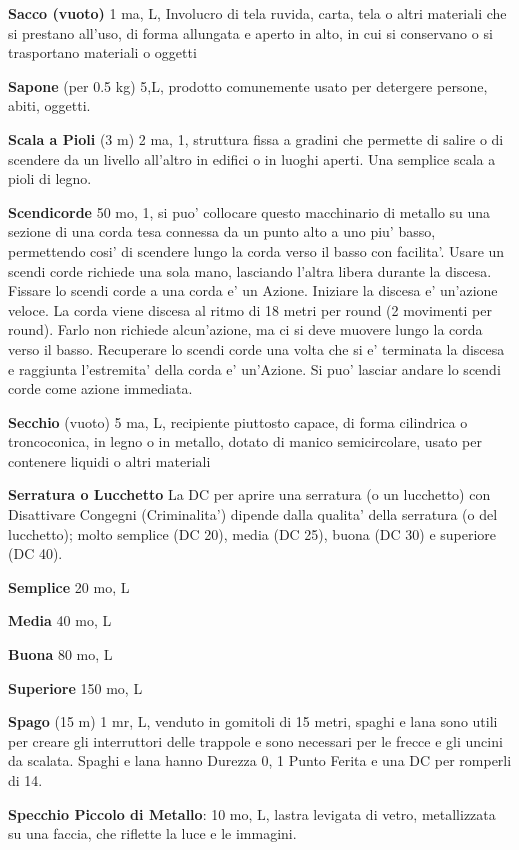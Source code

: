 \documentclass[a4paper,11pt,twoside,openany]{book}
\begin{document}
{\textbf{Sacco (vuoto)} 1 ma, L, Involucro di tela ruvida, carta, tela o altri materiali che si prestano all'uso, di forma allungata e aperto in alto, in cui si conservano o si trasportano materiali o oggetti

\textbf{Sapone} (per 0.5 kg) 5,L, prodotto comunemente usato per detergere persone, abiti, oggetti.

\textbf{Scala a Pioli} (3 m) 2 ma, 1, struttura fissa a gradini che permette di salire o di scendere da un livello all'altro in edifici o in luoghi aperti. Una semplice scala a pioli di legno.

\textbf{Scendicorde} 50 mo, 1, si puo' collocare questo macchinario di metallo su una sezione di una corda tesa connessa da un punto alto a uno piu' basso, permettendo cosi' di scendere lungo la corda verso il basso con facilita'. Usare un scendi corde richiede una sola mano, lasciando l'altra libera durante la discesa. Fissare lo scendi corde a una corda e' un Azione. Iniziare la discesa e' un'azione veloce. La corda viene discesa al ritmo di 18 metri per round (2 movimenti per round). Farlo non richiede alcun'azione, ma ci si deve muovere lungo la corda verso il basso. Recuperare lo scendi corde una volta che si e' terminata la discesa e raggiunta l'estremita' della corda e' un'Azione.
Si puo' lasciar andare lo scendi corde come azione immediata.

\textbf{Secchio} (vuoto) 5 ma, L, recipiente piuttosto capace, di forma cilindrica o troncoconica, in legno o in metallo, dotato di manico semicircolare, usato per contenere liquidi o altri materiali

\textbf{Serratura o Lucchetto} La DC per aprire una serratura (o un lucchetto) con Disattivare Congegni (Criminalita') dipende dalla qualita' della serratura (o del lucchetto); molto semplice (DC 20), media (DC 25), buona (DC 30) e superiore (DC 40).

\textbf{Semplice} 20 mo, L

\textbf{Media} 40 mo, L

\textbf{Buona} 80 mo, L

\textbf{Superiore} 150 mo, L

\textbf{Spago} (15 m) 1 mr, L, venduto in gomitoli di 15 metri, spaghi e lana sono utili per creare gli interruttori delle trappole e sono necessari per le frecce e gli uncini da scalata. Spaghi e lana hanno Durezza 0, 1 Punto Ferita e una DC per romperli di 14.

\textbf{Specchio Piccolo di Metallo}: 10 mo, L, lastra levigata di vetro, metallizzata su una faccia, che riflette la luce e le immagini.

}
\end{document}
